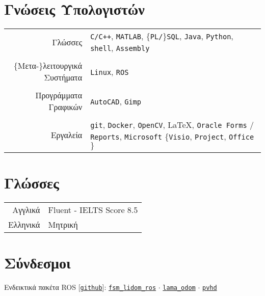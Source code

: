 \documentclass[a4paper,10pt,twoside]{article}
\begin{document}
\section{Γνώσεις Υπολογιστών}

\begin{tabular}{rp{9cm}}
  Γλώσσες & \texttt{C/C++}, \texttt{MATLAB}, $\{$\texttt{PL/}$\}$\texttt{SQL}, \texttt{Java}, \texttt{Python}, \texttt{shell}, \texttt{Assembly}\\
&\\
  $\{$Μετα-$\}$λειτουργικά Συστήματα & \texttt{Linux}, \texttt{ROS} \\
&\\
  Προγράμματα Γραφικών & \texttt{AutoCAD}, \texttt{Gimp}\\
&\\
  Εργαλεία & \texttt{git}, \texttt{Docker}, \texttt{OpenCV}, \LaTeX, \texttt{Oracle Forms} / \texttt{Reports}, \texttt{Microsoft} $\{$\texttt{Visio}, \texttt{Project}, \texttt{Office}$\}$
\end{tabular}



\section{Γλώσσες}

\begin{tabular}{rp{12cm}}
Αγγλικά & Fluent - IELTS Score 8.5\\
Ελληνικά & Μητρική
\end{tabular}

\section{Σύνδεσμοι}

Ενδεικτικά πακέτα ROS [\href{https://github.com/li9i}{\texttt{github}}]:
\href{https://github.com/li9i/fsm\_lidom\_ros}{\texttt{fsm\_lidom\_ros}} $\cdot$
\href{https://github.com/li9i/lama\_odom}{\texttt{lama\_odom}} $\cdot$
\href{https://github.com/li9i/pandora\_vision\_2014/tree/hydro-devel/pandora\_vision\_hole\_detector}{\texttt{pvhd}}
\end{document}
